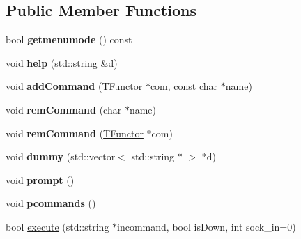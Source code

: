\subsection*{Public Member Functions}
\begin{DoxyCompactItemize}
\item 
bool {\bfseries getmenumode} () const \hypertarget{classcommandI_a416a2ab310c8982665d1a94193462d03}{}\label{classcommandI_a416a2ab310c8982665d1a94193462d03}

\item 
void {\bfseries help} (std\+::string \&d)\hypertarget{classcommandI_acf0766f9a6ee1b75b9dc97686bf6d292}{}\label{classcommandI_acf0766f9a6ee1b75b9dc97686bf6d292}

\item 
void {\bfseries add\+Command} (\hyperlink{classTFunctor}{T\+Functor} $\ast$com, const char $\ast$name)\hypertarget{classcommandI_af8697724746b2c0bc3edc08463be65fc}{}\label{classcommandI_af8697724746b2c0bc3edc08463be65fc}

\item 
void {\bfseries rem\+Command} (char $\ast$name)\hypertarget{classcommandI_a2af7b3ff8d4c1147ab3dc3ff7ea52e34}{}\label{classcommandI_a2af7b3ff8d4c1147ab3dc3ff7ea52e34}

\item 
void {\bfseries rem\+Command} (\hyperlink{classTFunctor}{T\+Functor} $\ast$com)\hypertarget{classcommandI_a7cb338a958c432ba728c5acb4a741af0}{}\label{classcommandI_a7cb338a958c432ba728c5acb4a741af0}

\item 
void {\bfseries dummy} (std\+::vector$<$ std\+::string $\ast$ $>$ $\ast$d)\hypertarget{classcommandI_afd106682e3c13c65b86edcabb696e2be}{}\label{classcommandI_afd106682e3c13c65b86edcabb696e2be}

\item 
void {\bfseries prompt} ()\hypertarget{classcommandI_aa81dc096135efb83be067a53e1d25399}{}\label{classcommandI_aa81dc096135efb83be067a53e1d25399}

\item 
void {\bfseries pcommands} ()\hypertarget{classcommandI_a3a4ab15e2fe0087a1c4e0aa5dd302899}{}\label{classcommandI_a3a4ab15e2fe0087a1c4e0aa5dd302899}

\item 
bool \hyperlink{classcommandI_a4918f1f16c279d905e3ca8c3c1c22f74}{execute} (std\+::string $\ast$incommand, bool is\+Down, int sock\+\_\+in=0)\hypertarget{classcommandI_a4918f1f16c279d905e3ca8c3c1c22f74}{}\label{classcommandI_a4918f1f16c279d905e3ca8c3c1c22f74}


\end{DoxyCompactItemize}

